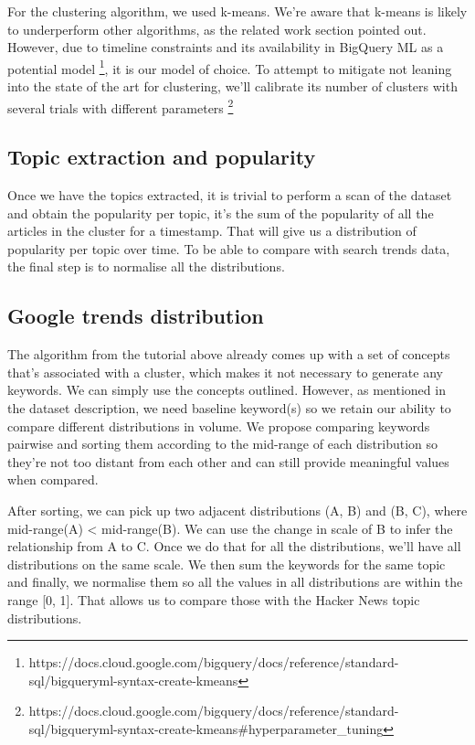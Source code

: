 \documentclass[nonacm,sigconf]{acmart}
\begin{document}
For the clustering algorithm, we used k-means. We're aware that k-means is likely to underperform other algorithms, as the related work section pointed out. However, due to timeline constraints and its availability in BigQuery ML as a potential model \footnote{https://docs.cloud.google.com/bigquery/docs/reference/standard-sql/bigqueryml-syntax-create-kmeans}, it is our model of choice. To attempt to mitigate not leaning into the state of the art for clustering, we'll calibrate its number of clusters with several trials with different parameters \footnote{https://docs.cloud.google.com/bigquery/docs/reference/standard-sql/bigqueryml-syntax-create-kmeans\#hyperparameter\_tuning}

\subsection{Topic extraction and popularity}

Once we have the topics extracted, it is trivial to perform a scan of the dataset and obtain the popularity per topic, it's the sum of the popularity of all the articles in the cluster for a timestamp. That will give us a distribution of popularity per topic over time. To be able to compare with search trends data, the final step is to normalise all the distributions.

\subsection{Google trends distribution}

The algorithm from the tutorial above already comes up with a set of concepts that's associated with a cluster, which makes it not necessary to generate any keywords. We can simply use the concepts outlined. However, as mentioned in the dataset description, we need baseline keyword(s) so we retain our ability to compare different distributions in volume. We propose comparing keywords pairwise and sorting them according to the mid-range of each distribution so they're not too distant from each other and can still provide meaningful values when compared.

After sorting, we can pick up two adjacent distributions (A, B) and (B, C), where mid-range(A) < mid-range(B). We can use the change in scale of B to infer the relationship from A to C. Once we do that for all the distributions, we'll have all distributions on the same scale. We then sum the keywords for the same topic and finally, we normalise them so all the values in all distributions are within the range [0, 1]. That allows us to compare those with the Hacker News topic distributions.
\end{document}
